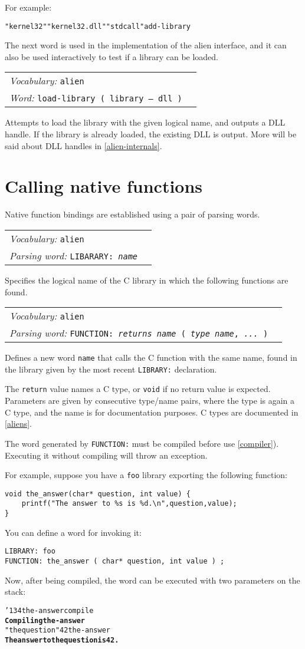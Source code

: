 \documentclass{book}
\newcommand{\bs}{\char'134}
\newcommand{\vocabulary}[1]{\emph{Vocabulary:} \texttt{#1}&\\}
\newcommand{\parsingword}[2]{\index{\texttt{#1}}\emph{Parsing word:} \texttt{#2}&\\}
\newcommand{\ordinaryword}[2]{\index{\texttt{#1}}\emph{Word:} \texttt{#2}&\\}
\newcommand{\wordtable}[1]{


\begin{tabularx}{12cm}{lX}
\hline
#1
\hline
\end{tabularx}

}
\begin{document}
For example:
\begin{alltt}
  "kernel32" "kernel32.dll"  "stdcall"  add-library
\end{alltt}
The next word is used in the implementation of the alien interface, and it can also be used
interactively to test if a library can be loaded.

\wordtable{
\vocabulary{alien}
\ordinaryword{load-library}{load-library ( library -- dll )}
}
Attempts to load the library with the given logical name, and outputs a DLL handle. If the library is already loaded, the existing DLL is output.
More will be said about DLL handles in \ref{alien-internals}.

\section{Calling native functions}

Native function bindings are established using a pair of parsing words.

\wordtable{
\vocabulary{alien}
\parsingword{LIBARARY:}{LIBARARY:~\emph{name}}
}
Specifies the logical name of the C library in which the following functions are found.

\wordtable{
\vocabulary{alien}
\parsingword{FUNCTION:}{FUNCTION:~\emph{returns} \emph{name} ( \emph{type} \emph{name}, \emph{...} )}
}
Defines a new word \verb|name| that calls the C function with the same name, found in the library given by the most recent \verb|LIBRARY:| declaration.

The \verb|return| value names a C type, or \verb|void| if no return value is expected.
Parameters are given by consecutive type/name pairs, where the type is again a C type, and the name is for documentation purposes. C types are documented in \ref{aliens}.

The word generated by \verb|FUNCTION:| must be compiled before use \ref{compiler}). Executing it without compiling will throw an exception.

For example, suppose you have a \verb|foo| library exporting the following function:
\begin{verbatim}
void the_answer(char* question, int value) {
    printf("The answer to %s is %d.\n",question,value);
}
\end{verbatim}
You can define a word for invoking it:
\begin{verbatim}
LIBRARY: foo
FUNCTION: the_answer ( char* question, int value ) ;
\end{verbatim}
Now, after being compiled, the word can be executed with two parameters on the stack:
\begin{alltt}
  \bs the-answer compile
\textbf{Compiling the-answer}
  "the question" 42 the-answer
\textbf{The answer to the question is 42.}
\end{alltt}
\end{document}
